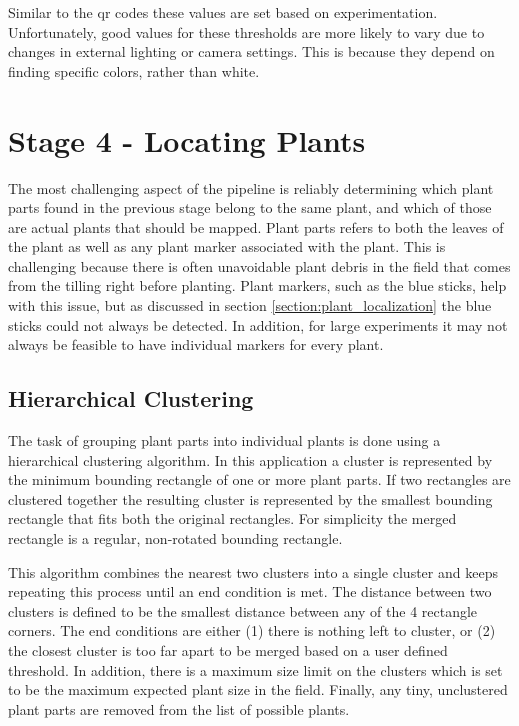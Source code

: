 Similar to the \ac{qr} codes these values are set based on experimentation.   Unfortunately, good values for these thresholds are more likely to vary due to changes in external lighting or camera settings.  This is because they depend on finding specific colors, rather than white.  

\section{Stage 4 - Locating Plants}
\label{processing-stage4}

The most challenging aspect of the pipeline is reliably determining which plant parts found in the previous stage belong to the same plant, and which of those are actual plants that should be mapped.  Plant parts refers to both the leaves of the plant as well as any plant marker associated with the plant.  This is challenging because there is often unavoidable plant debris in the field that comes from the tilling right before planting. Plant markers, such as the blue sticks, help with this issue, but as discussed in section \ref{section:plant_localization} the blue sticks could not always be detected.  In addition, for large experiments it may not always be feasible to have individual markers for every plant.  

\subsection{Hierarchical Clustering}

The task of grouping plant parts into individual plants is done using a hierarchical clustering algorithm.  In this application a cluster is represented by the minimum bounding rectangle of one or more plant parts.  If two rectangles are clustered together the resulting cluster is represented by the smallest bounding rectangle that fits both the original rectangles.  For simplicity the merged rectangle is a regular, non-rotated bounding rectangle. 

This algorithm combines the nearest two clusters into a single cluster and keeps repeating this process until an end condition is met.  The distance between two clusters is defined to be the smallest distance between any of the 4 rectangle corners.  The end conditions are either (1) there is nothing left to cluster, or (2) the closest cluster is too far apart to be merged based on a user defined threshold.  In addition, there is a maximum size limit on the clusters which is set to be the maximum expected plant size in the field.  Finally, any tiny, unclustered plant parts are removed from the list of possible plants. 

